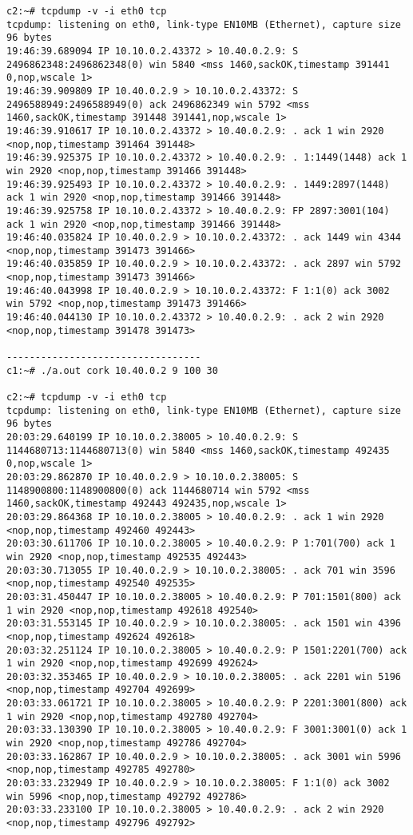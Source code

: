 \documentclass[a4paper,12pt]{article}
\begin{document}
\begin{lstlisting}
c2:~# tcpdump -v -i eth0 tcp
tcpdump: listening on eth0, link-type EN10MB (Ethernet), capture size 96 bytes
19:46:39.689094 IP 10.10.0.2.43372 > 10.40.0.2.9: S 2496862348:2496862348(0) win 5840 <mss 1460,sackOK,timestamp 391441 0,nop,wscale 1>
19:46:39.909809 IP 10.40.0.2.9 > 10.10.0.2.43372: S 2496588949:2496588949(0) ack 2496862349 win 5792 <mss 1460,sackOK,timestamp 391448 391441,nop,wscale 1>
19:46:39.910617 IP 10.10.0.2.43372 > 10.40.0.2.9: . ack 1 win 2920 <nop,nop,timestamp 391464 391448>
19:46:39.925375 IP 10.10.0.2.43372 > 10.40.0.2.9: . 1:1449(1448) ack 1 win 2920 <nop,nop,timestamp 391466 391448>
19:46:39.925493 IP 10.10.0.2.43372 > 10.40.0.2.9: . 1449:2897(1448) ack 1 win 2920 <nop,nop,timestamp 391466 391448>
19:46:39.925758 IP 10.10.0.2.43372 > 10.40.0.2.9: FP 2897:3001(104) ack 1 win 2920 <nop,nop,timestamp 391466 391448>
19:46:40.035824 IP 10.40.0.2.9 > 10.10.0.2.43372: . ack 1449 win 4344 <nop,nop,timestamp 391473 391466>
19:46:40.035859 IP 10.40.0.2.9 > 10.10.0.2.43372: . ack 2897 win 5792 <nop,nop,timestamp 391473 391466>
19:46:40.043998 IP 10.40.0.2.9 > 10.10.0.2.43372: F 1:1(0) ack 3002 win 5792 <nop,nop,timestamp 391473 391466>
19:46:40.044130 IP 10.10.0.2.43372 > 10.40.0.2.9: . ack 2 win 2920 <nop,nop,timestamp 391478 391473>

----------------------------------
c1:~# ./a.out cork 10.40.0.2 9 100 30

c2:~# tcpdump -v -i eth0 tcp
tcpdump: listening on eth0, link-type EN10MB (Ethernet), capture size 96 bytes
20:03:29.640199 IP 10.10.0.2.38005 > 10.40.0.2.9: S 1144680713:1144680713(0) win 5840 <mss 1460,sackOK,timestamp 492435 0,nop,wscale 1>
20:03:29.862870 IP 10.40.0.2.9 > 10.10.0.2.38005: S 1148900800:1148900800(0) ack 1144680714 win 5792 <mss 1460,sackOK,timestamp 492443 492435,nop,wscale 1>
20:03:29.864368 IP 10.10.0.2.38005 > 10.40.0.2.9: . ack 1 win 2920 <nop,nop,timestamp 492460 492443>
20:03:30.611706 IP 10.10.0.2.38005 > 10.40.0.2.9: P 1:701(700) ack 1 win 2920 <nop,nop,timestamp 492535 492443>
20:03:30.713055 IP 10.40.0.2.9 > 10.10.0.2.38005: . ack 701 win 3596 <nop,nop,timestamp 492540 492535>
20:03:31.450447 IP 10.10.0.2.38005 > 10.40.0.2.9: P 701:1501(800) ack 1 win 2920 <nop,nop,timestamp 492618 492540>
20:03:31.553145 IP 10.40.0.2.9 > 10.10.0.2.38005: . ack 1501 win 4396 <nop,nop,timestamp 492624 492618>
20:03:32.251124 IP 10.10.0.2.38005 > 10.40.0.2.9: P 1501:2201(700) ack 1 win 2920 <nop,nop,timestamp 492699 492624>
20:03:32.353465 IP 10.40.0.2.9 > 10.10.0.2.38005: . ack 2201 win 5196 <nop,nop,timestamp 492704 492699>
20:03:33.061721 IP 10.10.0.2.38005 > 10.40.0.2.9: P 2201:3001(800) ack 1 win 2920 <nop,nop,timestamp 492780 492704>
20:03:33.130390 IP 10.10.0.2.38005 > 10.40.0.2.9: F 3001:3001(0) ack 1 win 2920 <nop,nop,timestamp 492786 492704>
20:03:33.162867 IP 10.40.0.2.9 > 10.10.0.2.38005: . ack 3001 win 5996 <nop,nop,timestamp 492785 492780>
20:03:33.232949 IP 10.40.0.2.9 > 10.10.0.2.38005: F 1:1(0) ack 3002 win 5996 <nop,nop,timestamp 492792 492786>
20:03:33.233100 IP 10.10.0.2.38005 > 10.40.0.2.9: . ack 2 win 2920 <nop,nop,timestamp 492796 492792>


\end{lstlisting}
\end{document}
